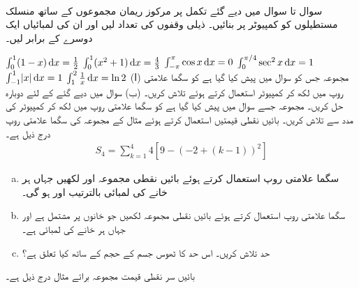 \\
سوال  تا سوال  میں دیے گئے تکمل پر مرکوز ریمان مجموعوں کے ساتھ منسلک مستطیلوں کو کمپیوٹر پر  بنائیں۔ ذیلی وقفوں کی تعداد  لیں اور ان کی لمبائیاں ایک دوسرے کے برابر لیں۔ 

$\int_0^1 (1-x)\dif x=\tfrac{1}{2}$
$\int_0^1(x^2+1)\dif x=\tfrac{4}{3}$
$\int_{-\pi}^{\pi}\cos x\dif x=0$
$\int_0^{\pi/4}\sec^2x\dif x=1$
$\int_{-1}^1\abs{x}\dif x=1$
$\int_1^2\tfrac{1}{x}\dif x=\ln 2$
(ا) مجموعہ  جس کو سوال  میں پیش کیا  گیا ہے کو سگما علامتی روپ میں لکھ کر کمپیوٹر استعمال کرتے ہوئے  تلاش کریں۔ (ب) سوال  میں دیے گئے  کے لئے دوبارہ حل کریں۔
مجموعہ  جسے سوال  میں پیش کیا گیا ہے کو سگما علامتی روپ میں لکھ کر کمپیوٹر کی مدد سے  تلاش کریں۔
بائیں نقطی قیمتیں استعمال کرتے ہوئے مثال  کے مجموعہ کی سگما علامتی روپ درج ذیل ہے۔
\begin{align*}
S_4=\sum\limits_{k=1}^4 4[9-(-2+(k-1))^2]
\end{align*} 
\begin{enumerate}[a.]
\item
سگما علامتی روپ استعمال کرتے ہوئے بائیں نقطی مجموعہ  اور  لکھیں جہاں ہر خانے کی لمبائی بالترتیب  اور  ہو گی۔
\item
سگما علامتی روپ استعمال کرتے ہوئے بائیں نقطی مجموعہ  لکھیں جو   خانوں پر مشتمل ہے اور جہاں ہر خانے کی لمبائی  ہے۔ 
\item
حد  تلاش کریں۔ اس حد کا ٹھوس جسم کے حجم کے ساتھ کیا تعلق ہے؟
\end{enumerate}
بائیں سر نقطی قیمت مجموعہ برائے مثال  درج ذیل ہے۔

